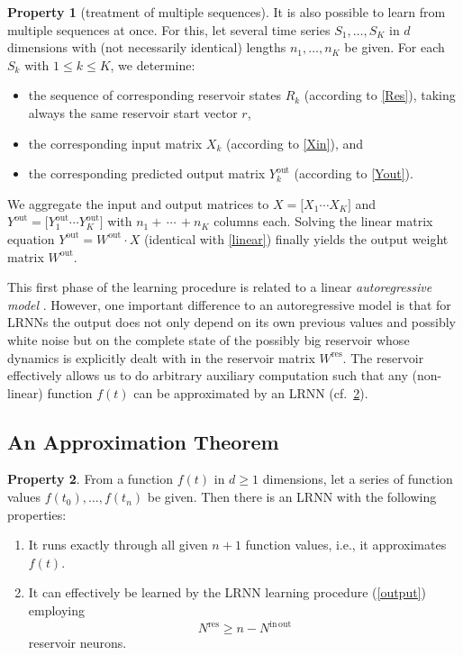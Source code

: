 \documentclass[preprint,12pt,times,authoryear]{elsarticle}%
\theoremstyle{definition}
\newtheorem{prop}{Property}
\begin{document}
\begin{prop}[treatment of multiple sequences]\label{multi}
It is also possible to learn from multiple sequences at once. For this, let
several time series $S_1,\dots,S_K$ in $d$ dimensions with (not necessarily
identical) lengths $n_1,\dots,n_K$ be given. For each $S_k$ with $1 \le k \le
K$, we determine:
\begin{itemize}
  \item the sequence of corresponding reservoir states $R_k$ (according to
	\cref{Res}), taking always the same reservoir start vector $r$,
  \item the corresponding input matrix $X_k$ (according to \cref{Xin}), and
  \item the corresponding predicted output matrix $Y^\mathrm{out}_k$ (according to \cref{Yout}).
\end{itemize}
We aggregate the input and output matrices to $X = \big[ X_1 \cdots X_K \big]$
and $Y^\mathrm{out} = \big[ Y^\mathrm{out}_1 \cdots Y^\mathrm{out}_K \big]$ with
$n_1+\,\cdots\,+n_K$ columns each. Solving the linear matrix equation
$Y^\mathrm{out} = W^\mathrm{out} \cdot X$ (identical with \cref{linear})
finally yields the output weight matrix $W^\mathrm{out}$.
\end{prop}

This first phase of the learning procedure is related to a linear
\emph{autoregressive model} \citep{Aka69}. However, one important
difference to an autoregressive model is that for LRNNs the output does not only
depend on its own previous values and possibly white noise but on the complete
state of the possibly big reservoir whose dynamics is explicitly dealt with in
the reservoir matrix $W^\mathrm{res}$. The reservoir effectively allows us to do
arbitrary auxiliary computation such that any (non-linear) function $f(t)$ can
be approximated by an LRNN (cf.~\cref{approx}).

\subsection{An Approximation Theorem}

\begin{prop}\label{approx}
From a function $f(t)$ in $d \ge 1$ dimensions, let a
series of function values $f(t_0),\dots,f(t_n)$ be given. Then there is an
LRNN with the following properties:
\begin{enumerate}
  \item It runs exactly through all given $n+1$ function values, i.e., it approximates $f(t)$.
  \item It can effectively be learned by the LRNN learning procedure (\cref{output}) employing
	\begin{equation}\label{ineq}
	  N^\mathrm{res} \ge n-N^\mathrm{in\,out}
	\end{equation}
	reservoir neurons.
\end{enumerate}
\end{prop}
\end{document}
